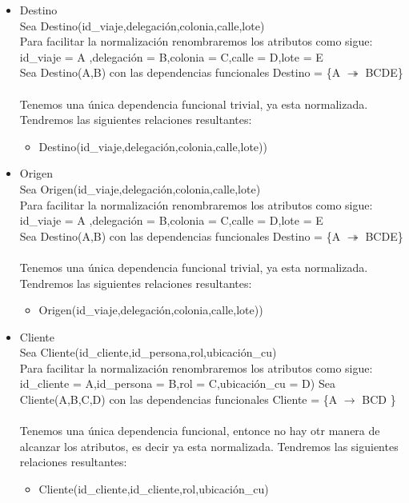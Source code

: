 \documentclass{article}
\begin{document}
\begin{itemize}
\item Destino\\
Sea Destino(id\_viaje,delegación,colonia,calle,lote)\\
Para facilitar la normalización renombraremos los atributos como sigue:
id\_viaje = A ,delegación = B,colonia = C,calle = D,lote = E\\
Sea Destino(A,B) con las dependencias funcionales
Destino = \{A $\twoheadrightarrow$ BCDE\} \\
\\
Tenemos una única dependencia funcional trivial, ya esta normalizada.
Tendremos las siguientes relaciones resultantes:
\begin{itemize}
\item Destino(id\_viaje,delegación,colonia,calle,lote))\\
\end{itemize}

\item Origen\\
Sea Origen(id\_viaje,delegación,colonia,calle,lote)\\
Para facilitar la normalización renombraremos los atributos como sigue:
id\_viaje = A ,delegación = B,colonia = C,calle = D,lote = E\\
Sea Destino(A,B) con las dependencias funcionales
Destino = \{A $\twoheadrightarrow$ BCDE\} \\
\\
Tenemos una única dependencia funcional trivial, ya esta normalizada.
Tendremos las siguientes relaciones resultantes:
\begin{itemize}
\item Origen(id\_viaje,delegación,colonia,calle,lote))\\
\end{itemize}

\item Cliente\\
Sea Cliente(id\_cliente,id\_persona,rol,ubicación\_cu)\\
Para facilitar la normalización renombraremos los atributos como sigue:
id\_cliente = A,id\_persona = B,rol = C,ubicación\_cu = D)
Sea Cliente(A,B,C,D) con las dependencias funcionales
Cliente = \{A $\rightarrow$ BCD \} \\
\\
Tenemos una única dependencia funcional, entonce no hay otr manera 
de alcanzar los atributos, es decir ya esta normalizada.
Tendremos las siguientes relaciones resultantes:
\begin{itemize}
\item Cliente(id\_cliente,id\_cliente,rol,ubicación\_cu)
\end{itemize}



\end{itemize}
\end{document}
